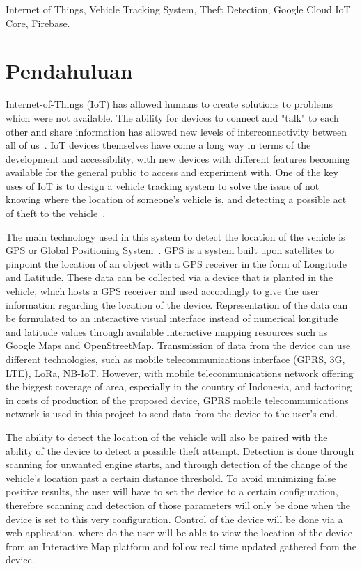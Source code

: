 \documentclass[conference]{IEEEtran}
\begin{document}
\begin{IEEEkeywords}
Internet of Things, Vehicle Tracking System, Theft Detection, Google Cloud IoT Core, Firebase.
\end{IEEEkeywords}

\section{Pendahuluan}
Internet-of-Things (IoT) has allowed humans to create solutions to problems which were not available. The ability for devices to connect and "talk" to each other and share information has allowed new levels of interconnectivity between all of us~\cite{iotmounika}. IoT devices themselves have come a long way in terms of the development and accessibility, with new devices with different features becoming available for the general public to access and experiment with. One of the key uses of IoT is to design a vehicle tracking system to solve the issue of not knowing where the location of someone's vehicle is, and detecting a possible act of theft to the vehicle~\cite{lu2014wireless}. 

The main technology used in this system to detect the location of the vehicle is GPS or Global Positioning System~\cite{iotmounika,6132526,6803187,article1}. GPS is a system built upon satellites to pinpoint the location of an object with a GPS receiver in the form of Longitude and Latitude. These data can be collected via a device that is planted in the vehicle, which hosts a GPS receiver and used accordingly to give the user information regarding the location of the device. Representation of the data can be formulated to an interactive visual interface instead of numerical longitude and latitude values through available interactive mapping resources such as Google Maps and OpenStreetMap. Transmission of data from the device can use different technologies, such as mobile telecommunications interface (GPRS, 3G, LTE), LoRa, NB-IoT. However, with mobile telecommunications network offering the biggest coverage of area, especially in the country of Indonesia, and factoring in costs of production of the proposed device, GPRS mobile telecommunications network is used in this project to send data from the device to the user's end.

The ability to detect the location of the vehicle will also be paired with the ability of the device to detect a possible theft attempt. Detection is done through scanning for unwanted engine starts, and through detection of the change of the vehicle's location past a certain distance threshold. To avoid minimizing false positive results, the user will have to set the device to a certain configuration, therefore scanning and detection of those parameters will only be done when the device is set to this very configuration. Control of the device will be done via a web application, where do the user will be able to view the location of the device from an Interactive Map platform and follow real time updated gathered from the device.
\end{document}
